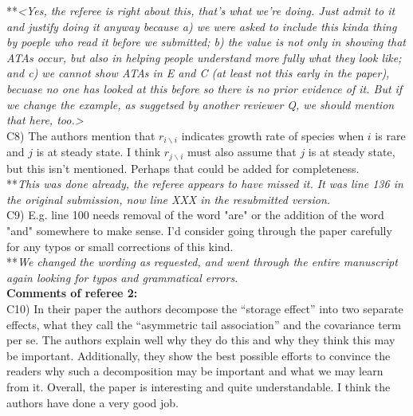 \documentclass[letterpaper,11pt]{article}
\newcommand{\bs}{\backslash}
\begin{document}
\noindent ***\emph{<Yes, the referee is right about this, that's what we're doing. Just admit to it and justify doing it anyway because a) we were asked to include this kinda thing by poeple who read it before we submitted; b) the value is not only in showing that ATAs occur, but also in helping people understand more fully what they look like; and c) we cannot show ATAs in E and C (at least not this early in the paper), becuase no one has looked at this before so there is no prior evidence of it. But if we change the example, as suggetsed by another reviewer Q, we should mention that here, too.>} \\

\noindent C8) The authors mention that $r_{i \bs i}$ indicates growth rate of species when $i$ is rare and $j$ is at steady state.  I think $r_{j \bs i}$ must also assume that $j$ is at steady state, but this isn't mentioned. Perhaps that could be added for completeness. \\

\noindent ***\emph{This was done already, the referee appears to have missed it. It was line 136 in the original submission,
now line XXX in the resubmitted version.} \\

\noindent C9) E.g. line 100 needs removal of the word "are" or the addition of the word "and" somewhere to make sense. I'd consider going through the paper carefully for any typos or small corrections of this kind. \\

\noindent ***\emph{We changed the wording as requested, and went through the entire manuscript again looking for typos
and grammatical errors.} \\

\noindent \textbf{Comments of referee 2:} \\

\noindent C10) In their paper the authors decompose the “storage effect” into two separate effects, what they call the “asymmetric tail association” and the covariance term per se. The authors explain well why they do this and why they think this may be important. Additionally, they show the best possible efforts to convince the readers why such a decomposition may be important and what we may learn from it. Overall, the paper is interesting and quite understandable. I think the authors have done a very good job. \\
\end{document}
